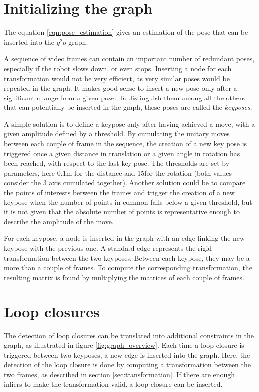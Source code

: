 \section{Initializing the graph}

The equation \ref{eqn:pose_estimation} gives an estimation of the pose that can be inserted into the $g^2o$ graph.

A sequence of video frames can contain an important number of redundant poses, especially if the robot slows down, or even stops. Inserting a node for each transformation would not be very efficient, as very similar poses would be repeated in the graph. It makes good sense to insert a new pose only after a significant change from a given pose. To distinguish them among all the others that can potentially be inserted in the graph, these poses are called the \emph{keyposes}. 

A simple solution is to define a keypose only after having achieved a move, with a given amplitude defined by a threshold. By cumulating the unitary moves between each couple of frame in the sequence, the creation of a new key pose is triggered once a given distance in translation or a given angle in rotation has been reached,  with respect to the last key pose. The thresholds are set by parameters, here 0.1m for the distance and 15\textdegree for the rotation (both values consider the 3 axis cumulated together). Another solution could be to compare the points of interests between the frames and trigger the creation of a new keypose when the number of points in common falls below a given threshold, but it is not given that the absolute number of points is representative enough to describe the amplitude of the move.

For each keypose, a node is inserted in the graph with an edge linking the new keypose with the previous one. A standard edge represents the rigid transformation between the two keyposes. Between each keypose, they may be a more than a couple of frames. To compute the corresponding transformation, the resulting matrix is found by multiplying the matrices of each couple of frames.

\section{Loop closures}

The detection of loop closures can be translated into additional constraints in the graph, as illustrated in figure \ref{fig:graph_overview}. Each time a loop closure is triggered between two keyposes, a new edge is inserted into the graph. Here, the detection of the loop closure is done by computing a transformation between the two frames, as described in section \ref{sec:transformation}. If there are enough inliers to make the transformation valid, a loop closure can be inserted.

